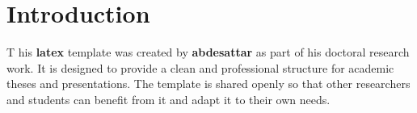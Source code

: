 \chapter*{Introduction}
 \lettrine[lines=3, lhang=0.1, loversize=0.1]{T}{} his \textbf{\acrshort{latex}} template was created by \textbf{\gls{abdesattar} }as part of his doctoral research work. It is designed to provide a clean and professional structure for academic theses and presentations. The template is shared openly so that other researchers and students can benefit from it and adapt it to their own needs.\\ 
 
 \lipsum[1-2]
  
 
 
 